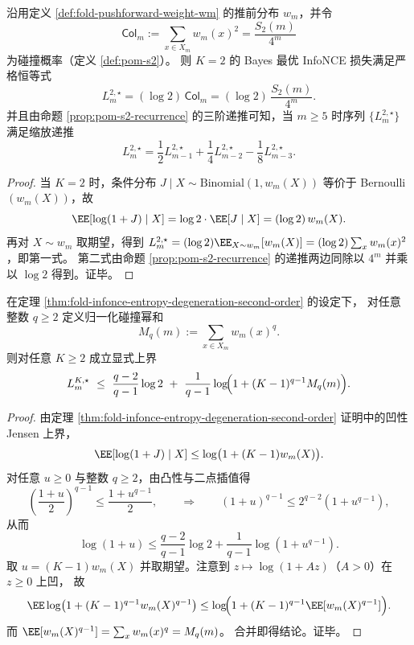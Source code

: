 \begin{corollary}[二阶碰撞概率刻画 \texorpdfstring{$K=2$}{K=2} 最优损失与三阶递推闭包]\label{cor:fold-infonce-k2-collision-recurrence-closure}
沿用定义 \ref{def:fold-pushforward-weight-wm} 的推前分布 \(w_m\)，并令
\[
\mathsf{Col}_m:=\sum_{x\in X_m}w_m(x)^2=\frac{S_2(m)}{4^m}
\]
为碰撞概率（定义 \ref{def:pom-s2}）。
则 \(K=2\) 的 Bayes 最优 InfoNCE 损失满足严格恒等式
\[
\boxed{\;
L_m^{2,\star}=(\log 2)\,\mathsf{Col}_m=(\log 2)\,\frac{S_2(m)}{4^m}.\;}
\]
并且由命题 \ref{prop:pom-s2-recurrence} 的三阶递推可知，当 \(m\ge 5\) 时序列 \(\{L_m^{2,\star}\}\) 满足缩放递推
\[
\boxed{\;
L_m^{2,\star}=\frac12 L_{m-1}^{2,\star}+\frac14 L_{m-2}^{2,\star}-\frac18 L_{m-3}^{2,\star}.\;}
\]
\end{corollary}

\begin{proof}
当 \(K=2\) 时，条件分布 \(J\mid X\sim\mathrm{Binomial}(1,w_m(X))\) 等价于 Bernoulli\((w_m(X))\)，故
\[
\EE[\log(1+J)\mid X]=\log 2\cdot \EE[J\mid X]=(\log 2)\,w_m(X).
\]
再对 \(X\sim w_m\) 取期望，得到
\(
L_m^{2,\star}=(\log 2)\EE_{X\sim w_m}[w_m(X)]=(\log 2)\sum_x w_m(x)^2
\)，即第一式。
第二式由命题 \ref{prop:pom-s2-recurrence} 的递推两边同除以 \(4^m\) 并乘以 \(\log 2\) 得到。证毕。
\end{proof}

\begin{theorem}\label{thm:fold-infonce-renyi-collision-upper-envelope}
在定理 \ref{thm:fold-infonce-entropy-degeneration-second-order} 的设定下，
对任意整数 \(q\ge 2\) 定义归一化碰撞幂和
\[
M_q(m):=\sum_{x\in X_m}w_m(x)^q.
\]
则对任意 \(K\ge 2\) 成立显式上界
\[
L_{m}^{K,\star}\ \le\
\frac{q-2}{q-1}\log 2\ +\ \frac{1}{q-1}\log\!\Bigl(1+(K-1)^{q-1}M_q(m)\Bigr).
\]
\end{theorem}
\begin{proof}
由定理 \ref{thm:fold-infonce-entropy-degeneration-second-order} 证明中的凹性 Jensen 上界，
\[
\EE[\log(1+J)\mid X]\le \log\bigl(1+(K-1)w_m(X)\bigr).
\]
对任意 \(u\ge 0\) 与整数 \(q\ge 2\)，由凸性与二点插值得
\[
\left(\frac{1+u}{2}\right)^{q-1}\le \frac{1+u^{q-1}}{2},
\qquad\Longrightarrow\qquad
(1+u)^{q-1}\le 2^{q-2}(1+u^{q-1}),
\]
从而
\[
\log(1+u)\le \frac{q-2}{q-1}\log 2+\frac{1}{q-1}\log(1+u^{q-1}).
\]
取 \(u=(K-1)w_m(X)\) 并取期望。注意到 \(z\mapsto \log(1+Az)\)（\(A>0\)）在 \(z\ge 0\) 上凹，
故
\[
\EE\log\bigl(1+(K-1)^{q-1}w_m(X)^{q-1}\bigr)
\le
\log\!\Bigl(1+(K-1)^{q-1}\EE[w_m(X)^{q-1}]\Bigr).
\]
而 \(\EE[w_m(X)^{q-1}]=\sum_x w_m(x)^q=M_q(m)\)。
合并即得结论。证毕。
\end{proof}

